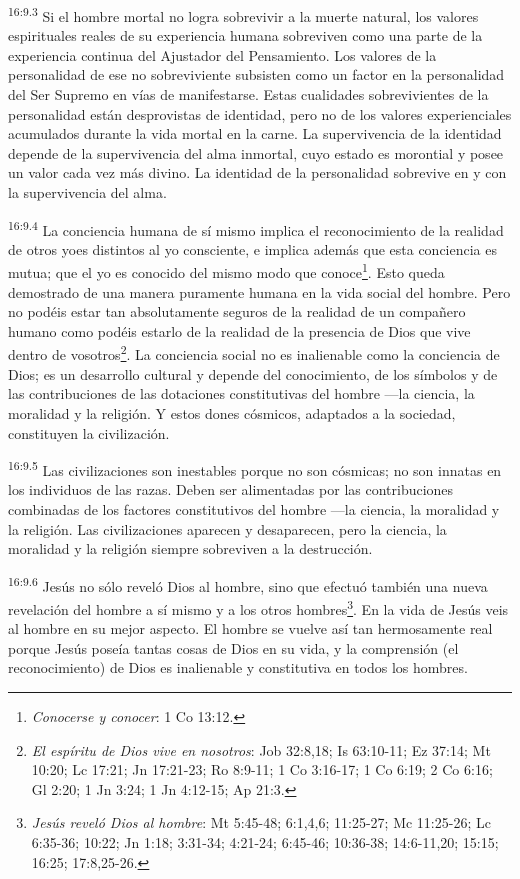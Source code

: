\par
\textsuperscript{16:9.3} Si el hombre mortal no logra sobrevivir a la muerte natural, los valores espirituales reales de su experiencia humana sobreviven como una parte de la experiencia continua del Ajustador del Pensamiento. Los valores de la personalidad de ese no sobreviviente subsisten como un factor en la personalidad del Ser Supremo en vías de manifestarse. Estas cualidades sobrevivientes de la personalidad están desprovistas de identidad, pero no de los valores experienciales acumulados durante la vida mortal en la carne. La supervivencia de la identidad depende de la supervivencia del alma inmortal, cuyo estado es morontial y posee un valor cada vez más divino. La identidad de la personalidad sobrevive en y con la supervivencia del alma.

\par
\textsuperscript{16:9.4} La conciencia humana de sí mismo implica el reconocimiento de la realidad de otros yoes distintos al yo consciente, e implica además que esta conciencia es mutua; que el yo es conocido del mismo modo que conoce\footnote{\textit{Conocerse y conocer}: 1 Co 13:12.}. Esto queda demostrado de una manera puramente humana en la vida social del hombre. Pero no podéis estar tan absolutamente seguros de la realidad de un compañero humano como podéis estarlo de la realidad de la presencia de Dios que vive dentro de vosotros\footnote{\textit{El espíritu de Dios vive en nosotros}: Job 32:8,18; Is 63:10-11; Ez 37:14; Mt 10:20; Lc 17:21; Jn 17:21-23; Ro 8:9-11; 1 Co 3:16-17; 1 Co 6:19; 2 Co 6:16; Gl 2:20; 1 Jn 3:24; 1 Jn 4:12-15; Ap 21:3.}. La conciencia social no es inalienable como la conciencia de Dios; es un desarrollo cultural y depende del conocimiento, de los símbolos y de las contribuciones de las dotaciones constitutivas del hombre ---la ciencia, la moralidad y la religión. Y estos dones cósmicos, adaptados a la sociedad, constituyen la civilización.

\par
\textsuperscript{16:9.5} Las civilizaciones son inestables porque no son cósmicas; no son innatas en los individuos de las razas. Deben ser alimentadas por las contribuciones combinadas de los factores constitutivos del hombre ---la ciencia, la moralidad y la religión. Las civilizaciones aparecen y desaparecen, pero la ciencia, la moralidad y la religión siempre sobreviven a la destrucción.

\par
\textsuperscript{16:9.6} Jesús no sólo reveló Dios al hombre, sino que efectuó también una nueva revelación del hombre a sí mismo y a los otros hombres\footnote{\textit{Jesús reveló Dios al hombre}: Mt 5:45-48; 6:1,4,6; 11:25-27; Mc 11:25-26; Lc 6:35-36; 10:22; Jn 1:18; 3:31-34; 4:21-24; 6:45-46; 10:36-38; 14:6-11,20; 15:15; 16:25; 17:8,25-26.}. En la vida de Jesús veis al hombre en su mejor aspecto. El hombre se vuelve así tan hermosamente real porque Jesús poseía tantas cosas de Dios en su vida, y la comprensión (el reconocimiento) de Dios es inalienable y constitutiva en todos los hombres.

